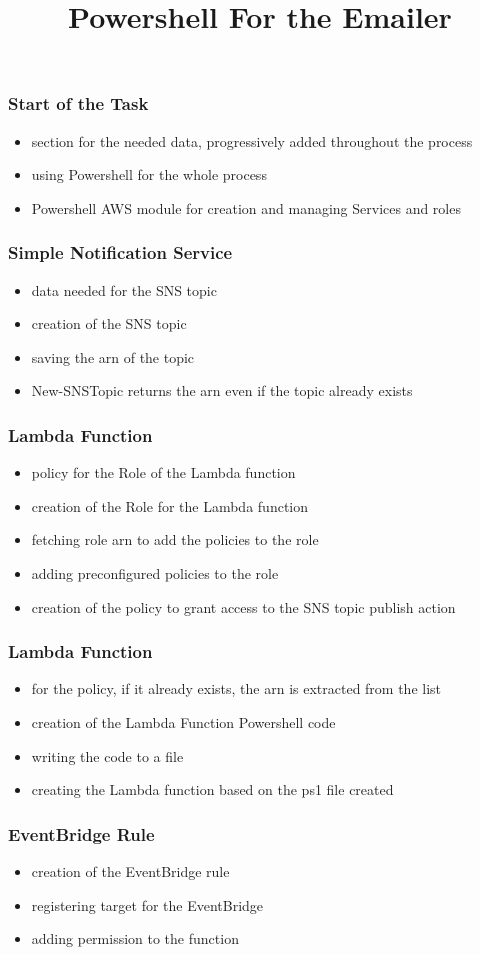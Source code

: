 \documentclass{beamer}
\title{Powershell For the Emailer}
\date{}
\begin{document}
\maketitle

\begin{frame}
	\frametitle{Start of the Task}
	\begin{itemize}
		\item section for the needed data, progressively added throughout the process
		\item using Powershell for the whole process
		\item Powershell AWS module for creation and managing Services and roles
	\end{itemize}
\end{frame}
	
\begin{frame}
	\frametitle{Simple Notification Service}
	\begin{itemize}
		\item data needed for the SNS topic
		\item creation of the SNS topic
		\item saving the arn of the topic
		\item New-SNSTopic returns the arn even if the topic already exists
	\end{itemize}
\end{frame}

\begin{frame}
	\frametitle{Lambda Function}
	\begin{itemize}
		\item policy for the Role of the Lambda function
		\item creation of the Role for the Lambda function
		\item fetching role arn to add the policies to the role
		\item adding preconfigured policies to the role
		\item creation of the policy to grant access to the SNS topic publish action
	\end{itemize}
\end{frame}

\begin{frame}
	\frametitle{Lambda Function}
	\begin{itemize}
		\item for the policy, if it already exists, the arn is extracted from the list
		\item creation of the Lambda Function Powershell code
		\item writing the code to a file
		\item creating the Lambda function based on the ps1 file created
	\end{itemize}
\end{frame}

\begin{frame}
	\frametitle{EventBridge Rule}
	\begin{itemize}
		\item creation of the EventBridge rule
		\item registering target for the EventBridge
		\item adding permission to the function
	\end{itemize}
\end{frame}
\end{document}
